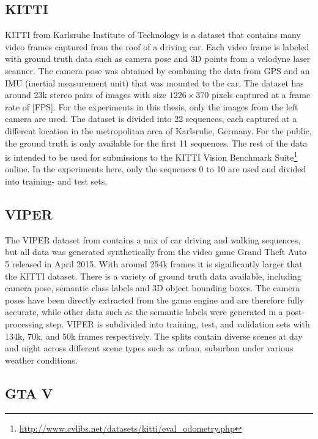 		\subsection{KITTI}
			KITTI from Karlsruhe Institute of Technology \cite{geiger2013vision} is a dataset that contains many video frames captured from the roof of a driving car.
			Each video frame is labeled with ground truth data such as camera pose and 3D points from a velodyne laser scanner.
			The camera pose was obtained by combining the data from GPS and an IMU (inertial measurement unit) that was mounted to the car.
			The dataset has around 23k stereo pairs of images with size $1226 \times 370$ pixels captured at a frame rate of [FPS].
			For the experiments in this thesis, only the images from the left camera are used.
			The dataset is divided into 22 sequences, each captured at a different location in the metropolitan area of Karlsruhe, Germany.
			For the public, the ground truth is only available for the first 11 sequences.
			The rest of the data is intended to be used for submissions to the KITTI Vision Benchmark Suite\footnote{\url{http://www.cvlibs.net/datasets/kitti/eval_odometry.php}} 
			online.
			In the experiments here, only the sequences 0 to 10 are used and divided into training- and test sets.
		
		\subsection{VIPER}
			The VIPER dataset from \cite{richter2017playing} contains a mix of car driving and walking sequences, but all data was generated synthetically from the video game Grand Theft Auto 5 released in April 2015.
			With around 254k frames it is significantly larger that the KITTI dataset.
			There is a variety of ground truth data available, including camera pose, semantic class labels and 3D object bounding boxes.
			The camera poses have been directly extracted from the game engine and are therefore fully accurate, while other data such as the semantic labels were generated in a post-processing step.
			VIPER is subdivided into training, test, and validation sets with 134k, 70k, and 50k frames respectively.
			The splits contain diverse scenes at day and night across different scene types such as urban, suburban under various weather conditions.
			
		\subsection{GTA V}
		
